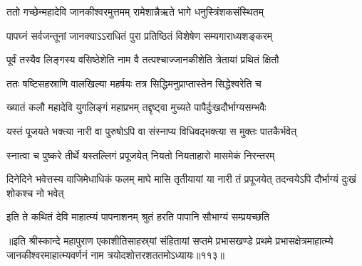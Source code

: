 
\vakta{}
\shrota{}
\tags{}
\notes{}

\storymeta





\twolineshloka
{ततो गच्छेन्महादेवि जानकीश्वरमुत्तमम्}
{रामेशान्नैऋते भागे धनुस्त्रिंशकसंस्थितम्}%

\twolineshloka
{पापघ्नं सर्वजन्तूनां जानक्याऽऽराधितं पुरा}
{प्रतिष्ठितं विशेषेण सम्यगाराध्यशङ्करम्}%

\twolineshloka
{पूर्वं तस्यैव लिङ्गस्य वसिष्ठेशेति नाम वै}
{तत्पश्चाज्जानकीशेति त्रेतायां प्रथितं क्षितौ}%

\twolineshloka
{ततः षष्टिसहस्राणि वालखिल्या महर्षयः}
{तत्र सिद्धिमनुप्राप्तास्तेन सिद्धेश्वरेति च}%

\twolineshloka
{ख्यातं कलौ महादेवि युगलिङ्गं महाप्रभम्}
{तद्दृष्ट्वा मुच्यते पापैर्दुःखदौर्भाग्यसम्भवैः}%

\twolineshloka
{यस्तं पूजयते भक्त्या नारी वा पुरुषोऽपि वा}
{संस्नाप्य विधिवद्भक्त्या स मुक्तः पातकैर्भवेत्}%

\twolineshloka
{स्नात्वा च पुष्करे तीर्थे यस्तल्लिगं प्रपूजयेत्}
{नियतो नियताहारो मासमेकं निरन्तरम्}%

\threelineshloka
{दिनेदिने भवेत्तस्य वाजिमेधाधिकं फलम्}
{माघे मासि तृतीयायां या नारी तं प्रपूजयेत्}
{तदन्वयेऽपि दौर्भाग्यं दुःखं शोकश्च नो भवेत्}%

\twolineshloka
{इति ते कथितं देवि माहात्म्यं पापनाशनम्}
{श्रुतं हरति पापानि सौभाग्यं सम्प्रयच्छति}%

॥इति श्रीस्कान्दे महापुराण एकाशीतिसाहस्र्यां संहितायां सप्तमे प्रभासखण्डे प्रथमे प्रभासक्षेत्रमाहात्म्ये जानकीश्वरमाहात्म्यवर्णनं नाम त्रयोदशोत्तरशततमोऽध्यायः॥११३॥